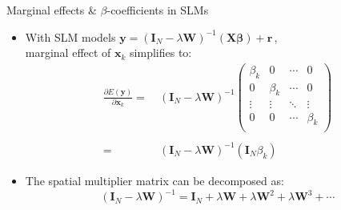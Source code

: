 \documentclass{beamer}
\begin{document}
\begin{frame}{Marginal effects \& $\beta$-coefficients in SLMs}
\begin{itemize}
    \item With SLM models $
\bm{y} = (\bm{I}_N - \lambda \bm{W})^{-1}
         (\bm{X \beta}) + \bm{r} \,$,\\ \medskip 
         marginal effect of $\bm{x}_k$ simplifies to: 
         \begin{equation*}
         \begin{aligned}
         \frac{\partial E(\bm{y})}{\partial \bm{x}_k}
          =&~(\bm{I}_N - \lambda \bm{W})^{-1}
	   \begin{pmatrix}
		\beta_{k} & 0& \cdots & 0\\
		0 & \beta_{k} & \cdots & 0\\
		\vdots & \vdots & \ddots & \vdots \\
		0 & 0 & \cdots & \beta_{k} \\
	   \end{pmatrix} \\
    & \\
    =&~(\bm{I}_N - \lambda \bm{W})^{-1} (\bm{I}_N \beta_k)
    \end{aligned}
    \end{equation*} 
    \item The spatial multiplier matrix can be decomposed as:
    $$
    (\bm{I}_N - \lambda \bm{W})^{-1} = 
    \bm{I}_N + \lambda \bm{W} + \lambda \bm{W}^2 + \lambda \bm{W}^3 + \cdots
    $$
\end{itemize}
\end{frame}
\end{document}
